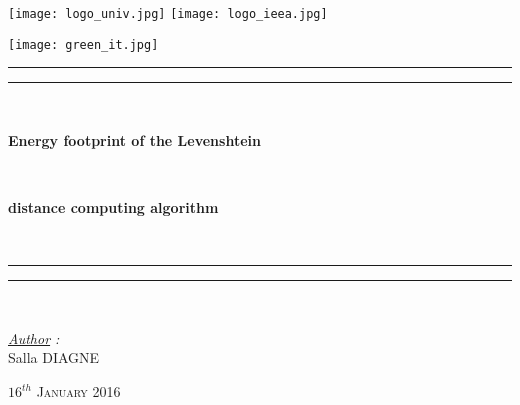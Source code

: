 \thispagestyle{cover}

\texttt{[image: logo\_univ.jpg]}
 \hfill \texttt{[image: logo\_ieea.jpg]} \\

\vspace*{7mm}

\begin{center}
	
	\texttt{[image: green\_it.jpg]}
	
	\vspace*{12mm}	

	\rule[0.5ex]{\linewidth}{2pt}\vspace*{-\baselineskip}\vspace*{3.2pt}
	\rule[0.5ex]{\linewidth}{1pt}\\[\baselineskip]

		\begin{Huge} \textbf{Energy footprint of the Levenshtein} \end{Huge}\\[4mm]
		\begin{Huge} \textbf{distance computing algorithm} \end{Huge}\\[4mm]
	\rule[0.5ex]{\linewidth}{1pt}\vspace*{-\baselineskip}\vspace{3.2pt}
	\rule[0.5ex]{\linewidth}{2pt}\\

	\vspace*{20mm}

	{\LARGE \textit{\underline{Author} :}}\\
	\vspace*{6mm}
	{\LARGE Salla DIAGNE}\\
	
	\vspace*{20mm}
	
	{\LARGE\textsc{$16^{th}$ January 2016}}
\end{center}